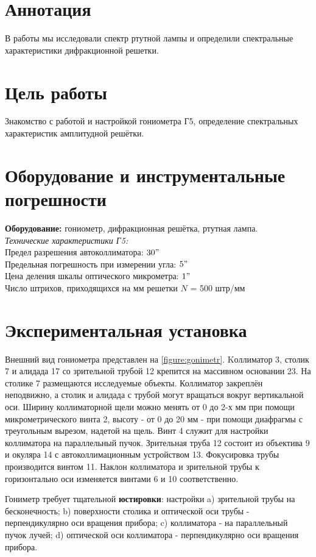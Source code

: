 \section*{Аннотация}
В работы мы исследовали спектр ртутной лампы и определили спектральные характеристики дифракционной решетки.\\\indent
\section*{Цель работы}
Знакомство с работой и настройкой гониометра Г5,
определение спектральных характеристик амплитудной решётки.\\\indent

\section*{Оборудование и инструментальные погрешности}
\textbf{Оборудование:} гониометр, дифракционная решётка, ртутная лампа.
\\\noindent\textit{Технические характеристики Г5:}\\
Предел разрешения автоколлиматора: $30"$\\
Предельная погрешность при измерении угла: $5"$\\
Цена деления шкалы оптического микрометра: $1"$\\
Число штрихов, приходящихся на мм решетки $N$ = 500 штр/мм

\section*{Экспериментальная установка}
Внешний вид гониометра представлен на \ref{figure:gonimetr}. Kоллиматор 3, столик 7 и алидада 17 со зрительной трубой 12 крепится на
массивном основании 23. На столике 7 размещаются исследуемые объекты.
Коллиматор закреплён неподвижно, а столик и алидада с трубой могут вращаться
вокруг вертикальной оси.
Ширину коллиматорной щели можно менять от 0 до 2-х мм при помощи
микрометрического винта 2, высоту - от 0 до 20 мм - при помощи диафрагмы с треугольным вырезом, надетой на щель. Винт 4 служит для настройки коллиматора на параллельный пучок.
Зрительная труба 12 состоит из объектива 9 и окуляра 14 с автоколлимационным
устройством 13. Фокусировка трубы производится винтом 11. Наклон коллиматора 
и зрительной трубы к горизонтально оси изменяется винтами 6 и 10 соответственно.

\indent Гониметр требует тщательной \textbf{юстировки}:
настройки
a) зрительной трубы на бесконечность;
b) поверхности столика и оптической оси трубы - перпендикулярно оси вращения прибора;
c) коллиматора - на параллельный пучок лучей;
d) оптической оси коллиматора - перпендикулярно оси вращения прибора.

